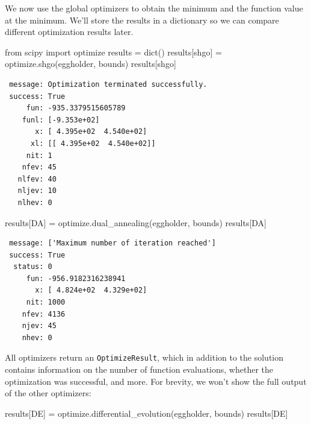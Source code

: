 \documentclass[
  letterpaper,
  DIV=11,
  numbers=noendperiod]{scrreprt}
\newenvironment{Shaded}{\begin{snugshade}}{\end{snugshade}}
\newcommand{\BuiltInTok}[1]{\textcolor[rgb]{0.00,0.23,0.31}{#1}}
\newcommand{\ImportTok}[1]{\textcolor[rgb]{0.00,0.46,0.62}{#1}}
\newcommand{\NormalTok}[1]{\textcolor[rgb]{0.00,0.23,0.31}{#1}}
\newcommand{\OperatorTok}[1]{\textcolor[rgb]{0.37,0.37,0.37}{#1}}
\newcommand{\StringTok}[1]{\textcolor[rgb]{0.13,0.47,0.30}{#1}}
\begin{document}
We now use the global optimizers to obtain the minimum and the function
value at the minimum. We'll store the results in a dictionary so we can
compare different optimization results later.

\begin{Shaded}
\begin{Highlighting}[]
\ImportTok{from}\NormalTok{ scipy }\ImportTok{import}\NormalTok{ optimize}
\NormalTok{results }\OperatorTok{=} \BuiltInTok{dict}\NormalTok{()}
\NormalTok{results[}\StringTok{\textquotesingle{}shgo\textquotesingle{}}\NormalTok{] }\OperatorTok{=}\NormalTok{ optimize.shgo(eggholder, bounds)}
\NormalTok{results[}\StringTok{\textquotesingle{}shgo\textquotesingle{}}\NormalTok{]}
\end{Highlighting}
\end{Shaded}

\begin{verbatim}
 message: Optimization terminated successfully.
 success: True
     fun: -935.3379515605789
    funl: [-9.353e+02]
       x: [ 4.395e+02  4.540e+02]
      xl: [[ 4.395e+02  4.540e+02]]
     nit: 1
    nfev: 45
   nlfev: 40
   nljev: 10
   nlhev: 0
\end{verbatim}

\begin{Shaded}
\begin{Highlighting}[]
\NormalTok{results[}\StringTok{\textquotesingle{}DA\textquotesingle{}}\NormalTok{] }\OperatorTok{=}\NormalTok{ optimize.dual\_annealing(eggholder, bounds)}
\NormalTok{results[}\StringTok{\textquotesingle{}DA\textquotesingle{}}\NormalTok{]}
\end{Highlighting}
\end{Shaded}

\begin{verbatim}
 message: ['Maximum number of iteration reached']
 success: True
  status: 0
     fun: -956.9182316238941
       x: [ 4.824e+02  4.329e+02]
     nit: 1000
    nfev: 4136
    njev: 45
    nhev: 0
\end{verbatim}

All optimizers return an \texttt{OptimizeResult}, which in addition to
the solution contains information on the number of function evaluations,
whether the optimization was successful, and more. For brevity, we won't
show the full output of the other optimizers:

\begin{Shaded}
\begin{Highlighting}[]
\NormalTok{results[}\StringTok{\textquotesingle{}DE\textquotesingle{}}\NormalTok{] }\OperatorTok{=}\NormalTok{ optimize.differential\_evolution(eggholder, bounds)}
\NormalTok{results[}\StringTok{\textquotesingle{}DE\textquotesingle{}}\NormalTok{]}
\end{Highlighting}
\end{Shaded}
\end{document}
